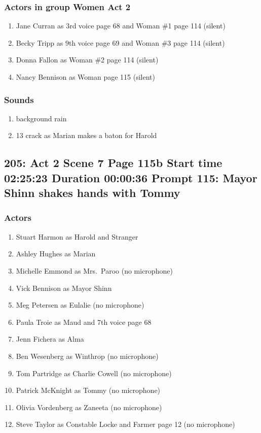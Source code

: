\subsubsection{Actors in group Women Act 2}
\begin{enumerate}
\item Jane Curran as 3rd voice page 68 and Woman \#1 page 114 (silent)
\item Becky Tripp as 9th voice page 69 and Woman \#3 page 114 (silent)
\item Donna Fallon as Woman \#2 page 114 (silent)
\item Nancy Bennison as Woman page 115 (silent)
\end{enumerate}

\subsubsection{Sounds}
\begin{enumerate}
\item background rain
\item 13 crack as Marian makes a baton for Harold
\end{enumerate}
\subsection{205: Act 2 Scene 7 Page 115b Start time 02:25:23 Duration 00:00:36 Prompt 115: Mayor Shinn shakes hands with Tommy}

\subsubsection{Actors}
\begin{enumerate}
\item Stuart Harmon as Harold and Stranger
\item Ashley Hughes as Marian
\item Michelle Emmond as Mrs.~Paroo (no microphone)
\item Vick Bennison as Mayor Shinn
\item Meg Petersen as Eulalie (no microphone)
\item Paula Troie as Maud and 7th voice page 68
\item Jenn Fichera as Alma
\item Ben Wesenberg as Winthrop (no microphone)
\item Tom Partridge as Charlie Cowell (no microphone)
\item Patrick McKnight as Tommy (no microphone)
\item Olivia Vordenberg as Zaneeta (no microphone)
\item Steve Taylor as Constable Locke and Farmer page 12 (no microphone)
\end{enumerate}
